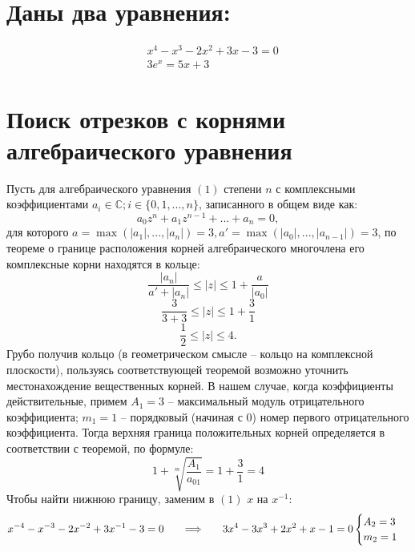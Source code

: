 


\clearpage
{}
\setcounter{page}{2}
\tableofcontents

\clearpage
\section*{Даны два уравнения:}
\begin{align}
    &x^4-x^3-2x^2+3x-3=0\\
    &3e^x=5x+3
\end{align}
\section{Поиск отрезков с корнями алгебраического уравнения}
Пусть для алгебраического уравнения $(1)$ степени $n$ с комплексными коэффициентами $a_i\in\mathbb{C}; i\in \{0, 1, ..., n\}$, записанного в общем виде как:
\[
    a_0z^n+a_1z^{n-1}+...+a_n=0,
\]
для которого $a=\max(|a_1|,...,|a_n|)=3, a'=\max(|a_0|,...,|a_{n-1}|)=3$, по теореме о границе расположения корней алгебраического многочлена его комплексные корни находятся в кольце:
\begin{equation}
    \frac{|a_n|}{a'+|a_n|}\le |z| \le 1+\frac{a}{|a_0|}
\end{equation}
\[
    \frac{3}{3+3}\le |z| \le 1+\frac{3}{1}
\]
\begin{equation}
    \frac{1}{2}\le |z| \le 4.
\end{equation}
Грубо получив кольцо (в геометрическом смысле -- кольцо на комплексной плоскости), пользуясь соответствующей теоремой возможно уточнить местонахождение вещественных корней. В нашем случае, когда коэффициенты действительные, примем $A_1=3$ -- максимальный модуль отрицательного коэффициента; $m_1=1$ -- порядковый (начиная с $0$) номер первого отрицательного коэффициента. Тогда верхняя граница положительных корней определяется в соответствии с теоремой, по формуле:
\begin{equation}
    1 + \sqrt[m]{\frac{A_1}{a_{01}}} = 1 +\frac{3}{1} = 4
\end{equation}
Чтобы найти нижнюю границу, заменим в $(1)$ $x$ на $x^{-1}$:
\begin{equation}
    x^{-4}-x^{-3}-2x^{-2}+3x^{-1}-3=0 \hspace{0.5cm} \implies \hspace{0.5cm}
    3x^4-3x^3+2x^2+x-1=0
    \begin{cases}
        A_2 = 3 \\
        m_2 = 1
    \end{cases}
\end{equation}
